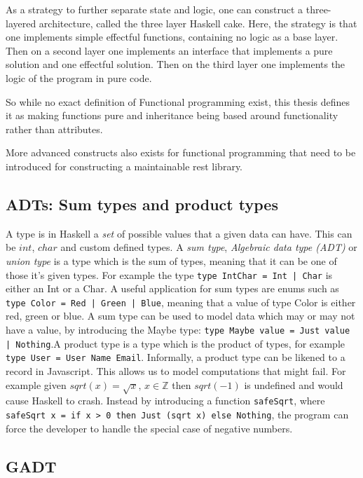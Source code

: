 \begin{description}
As a strategy to further separate state and logic, one can construct a
        three-layered architecture, called the three layer Haskell cake. Here,
        the strategy is that one implements simple effectful functions,
        containing no logic as a base layer. Then on a second layer one
        implements an interface that implements a pure solution and one
        effectful solution. Then on the third layer one implements the logic of
        the program in pure code.  
\end{description}

So while no exact definition of Functional programming exist, this thesis
defines it as making functions pure and inheritance being based around
functionality rather than attributes. 

More advanced constructs also exists for functional programming that need to be
introduced for constructing a maintainable rest library. 

\subsection{ADTs: Sum types and product types}\label{types}

A type is in Haskell a \textit{set} of possible values that a given data can
have. This can be $int$, $char$ and custom defined types. A \textit{sum type},
\textit{Algebraic data type (ADT)} or \textit{union type} is a type which is the
sum of types, meaning that it can be one of those it's given types. For example
the type \texttt{type IntChar = Int | Char} is either an Int or a Char. A useful
application for sum types are enums such as \texttt{type Color = Red | Green |
Blue}, meaning that a value of type Color is either red, green or blue. A sum
type can be used to model data which may or may not have a value, by introducing
the Maybe type: \texttt{type Maybe value = Just value | Nothing}.A product type
is a type which is the product of types, for example \texttt{type User = User
Name Email}.  Informally, a product type can be likened to a record in
Javascript.  This allows us to model computations that might fail. For example
given $sqrt(x) = \sqrt{x},\, x\in \mathbb{Z}$ then $sqrt(-1)$ is undefined and
would cause Haskell to crash.  Instead by introducing a function
\texttt{safeSqrt}, where \texttt{safeSqrt x = if x > 0 then Just (sqrt x) else
Nothing}, the program can force the developer to handle the special case of
negative numbers. 

\subsection{GADT}\label{gadt}

